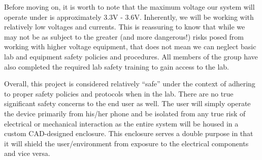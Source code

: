 \documentclass[12pt]{article}
\begin{document}
Before moving on, it is worth to note that the maximum voltage our system will operate under is approximately 3.3V - 3.6V. Inherently, we will be working with relatively low voltages and currents. This is reassuring to know that while we may not be as subject to the greater (and more dangerous!) risks posed from working with higher voltage equipment, that does not mean we can neglect basic lab and equipment safety policies and procedures. All members of the group have also completed the required lab safety training to gain access to the lab. 

Overall, this project is considered relatively ``safe'' under the context of adhering to proper safety policies and protocols when in the lab. There are no true significant safety concerns to the end user as well. The user will simply operate the device primarily from his/her phone and be isolated from any true risk of electrical or mechanical interaction as the entire system will be housed in a custom CAD-designed enclosure. This enclosure serves a double purpose in that it will shield the user/environment from exposure to the electrical components and vice versa. 




\end{document}
